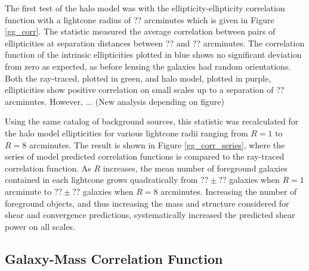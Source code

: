 \documentclass[%
 reprint,
 amsmath,amssymb,
 aps,nofootinbib
]{revtex4-1}
\begin{document}
The first test of the halo model was with the ellipticity-ellipticity correlation function with a lightcone radius of ?? arcminutes which is given in Figure \ref{gg_corr}. The statistic measured the average correlation between pairs of ellipticities at separation distances between ?? and ?? arcminutes. The correlation function of the intrinsic ellipticities plotted in blue shows no significant deviation from zero as expected, as before lensing the galaxies had random orientations. Both the ray-traced, plotted in green, and halo model, plotted in purple, ellipticities show positive correlation on small scales up to a separation of ?? arcminutes. However, ... (New analysis depending on figure)


Using the same catalog of background sources, this statistic was recalculated for the halo model ellipticities for various lightcone radii ranging from $R=1$ to $R=8$ arcminutes. The result is shown in Figure \ref{gg_corr_series}, where the series of model predicted correlation functions is compared to the ray-traced correlation function. As $R$ increases, the mean number of foreground galaxies contained in each lightcone grows quadratically from ${??\pm??}$ galaxies when $R=1$ arcminute to ${??\pm??}$ galaxies when $R=8$ arcminutes. Increasing the number of foreground objects, and thus increasing the mass and structure considered for shear and convergence predictions, systematically increased the predicted shear power on all scales. 



\subsection{Galaxy-Mass Correlation Function}
\end{document}

